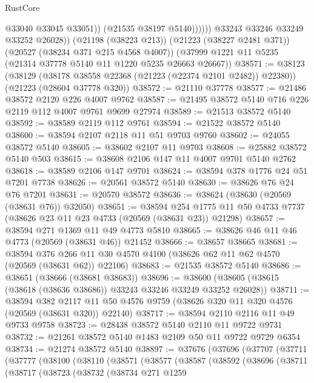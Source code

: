 \begin{lexlean}{RustCore}
\begin{coremodule}
                      @33040
                      @33045
                      @33051))
                  (@21535 @38197 @5140))))))
        @33243
        @33246
        @33249
        @33252
        @26028))
    (@21198 (@38223 @213))
    (@21223 (@38227 @2481 @371))
    (@20527 (@38234 @371 @215 @4568 @4007))
    (@37999 @1221 @11 @5235 (@21314 @37778 @5140 @11 @1220 @5235 @26663 @26667))
@38571 := @38123
    (@38129 (@38178 @38558 @22368 (@21223 (@22374 @2101 @2482)) @22380))
    (@21223 (@28604 @37778 @320))
@38572 := @21110 @37778
@38577 := @21486 @38572 @2120 @226 @4007 @9762
@38587 := @21495 @38572 @5140 @716 @226 @2119 @112 @4007 @9761 @9699 @27974
@38589 := @21513 @38572 @5140
@38592 := @38589 @2119 @112 @9761
@38594 := @21522 @38572 @5140
@38600 := @38594 @2107 @2118 @11 @51 @9703 @9760
@38602 := @24055 @38572 @5140
@38605 := @38602 @2107 @11 @9703
@38608 := @25882 @38572 @5140 @503
@38615 := @38608 @2106 @147 @11 @4007 @9701 @5140 @2762
@38618 := @38589 @2106 @147 @9701
@38624 := @38594 @378 @1776 @24 @51 @7201 @7738
@38626 := @20561 @38572 @5140
@38630 := @38626 @76 @24 @76 @7201
@38631 := @20570 @38572
@38636 := @38624 (@38630 (@20569 (@38631 @76)) @32050)
@38651 := @38594
    @254
    @1775
    @11
    @50
    @4733
    @7737
    (@38626 @23 @11 @23 @4733 (@20569 (@38631 @23)) @21298)
@38657 := @38594 @271 @1369 @11 @49 @4773 @5810
@38665 := @38626 @46 @11 @46 @4773 (@20569 (@38631 @46)) @21452
@38666 := @38657 @38665
@38681 := @38594
    @376
    @266
    @11
    @30
    @4570
    @4100
    (@38626 @62 @11 @62 @4570 (@20569 (@38631 @62)) @22106)
@38683 := @21535 @38572 @5140
@38686 := @38651 (@38666 (@38681 @38683))
@38696 := @38600 (@38605 (@38615 (@38618 (@38636 @38686)) @33243 @33246 @33249 @33252 @26028))
@38711 := @38594
    @382
    @2117
    @11
    @50
    @4576
    @9759
    (@38626 @320 @11 @320 @4576 (@20569 (@38631 @320)) @22140)
@38717 := @38594 @2110 @2116 @11 @49 @9733 @9758
@38723 := @28438 @38572 @5140 @2110 @11 @9722 @9731
@38732 := @21261 @38572 @5140 @1483 @2109 @50 @11 @9722 @9729 @6354
@38734 := @21274 @38572 @5140
@38897 := @37676
    (@37696
      (@37707
        (@37711
          (@37777
            (@38100
              (@38110
                (@38571
                  (@38577
                    (@38587
                      (@38592
                        (@38696
                          (@38711
                            (@38717
                              (@38723
                                (@38732
                                  (@38734
                                    @271
                                    @1259

\end{coremodule}
\end{lexlean}
